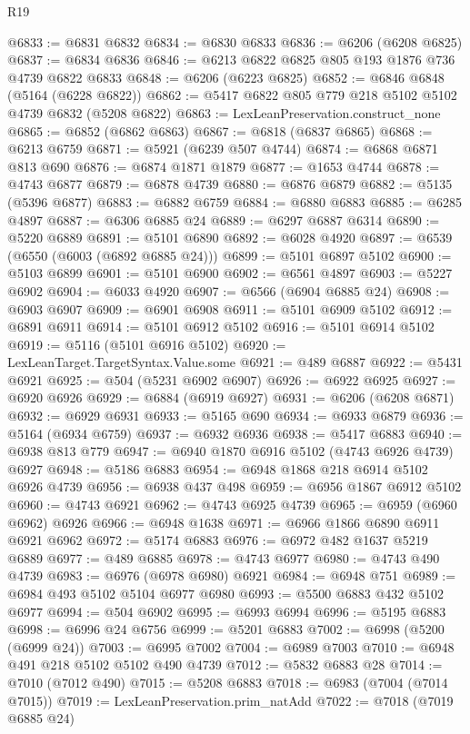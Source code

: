 \begin{lexlean}{R19}
\begin{coremodule}
{{{{{{{{{{{@6833 := @6831 @6832
@6834 := @6830 @6833
@6836 := @6206 (@6208 @6825)
@6837 := @6834 @6836
@6846 := @6213 @6822 @6825 @805 @193 @1876 @736 @4739 @6822 @6833
@6848 := @6206 (@6223 @6825)
@6852 := @6846 @6848 (@5164 (@6228 @6822))
@6862 := @5417 @6822 @805 @779 @218 @5102 @5102 @4739 @6832 (@5208 @6822)
@6863 := LexLeanPreservation.construct_none
@6865 := @6852 (@6862 @6863)
@6867 := @6818 (@6837 @6865)
@6868 := @6213 @6759
@6871 := @5921 (@6239 @507 @4744)
@6874 := @6868 @6871 @813 @690
@6876 := @6874 @1871 @1879
@6877 := @1653 @4744
@6878 := @4743 @6877
@6879 := @6878 @4739
@6880 := @6876 @6879
@6882 := @5135 (@5396 @6877)
@6883 := @6882 @6759
@6884 := @6880 @6883
@6885 := @6285 @4897
@6887 := @6306 @6885 @24
@6889 := @6297 @6887 @6314
@6890 := @5220 @6889
@6891 := @5101 @6890
@6892 := @6028 @4920
@6897 := @6539 (@6550 (@6003 (@6892 @6885 @24)))
@6899 := @5101 @6897 @5102
@6900 := @5103 @6899
@6901 := @5101 @6900
@6902 := @6561 @4897
@6903 := @5227 @6902
@6904 := @6033 @4920
@6907 := @6566 (@6904 @6885 @24)
@6908 := @6903 @6907
@6909 := @6901 @6908
@6911 := @5101 @6909 @5102
@6912 := @6891 @6911
@6914 := @5101 @6912 @5102
@6916 := @5101 @6914 @5102
@6919 := @5116 (@5101 @6916 @5102)
@6920 := LexLeanTarget.TargetSyntax.Value.some
@6921 := @489 @6887
@6922 := @5431 @6921
@6925 := @504 (@5231 @6902 @6907)
@6926 := @6922 @6925
@6927 := @6920 @6926
@6929 := @6884 (@6919 @6927)
@6931 := @6206 (@6208 @6871)
@6932 := @6929 @6931
@6933 := @5165 @690
@6934 := @6933 @6879
@6936 := @5164 (@6934 @6759)
@6937 := @6932 @6936
@6938 := @5417 @6883
@6940 := @6938 @813 @779
@6947 := @6940 @1870 @6916 @5102 (@4743 @6926 @4739) @6927
@6948 := @5186 @6883
@6954 := @6948 @1868 @218 @6914 @5102 @6926 @4739
@6956 := @6938 @437 @498
@6959 := @6956 @1867 @6912 @5102
@6960 := @4743 @6921
@6962 := @4743 @6925 @4739
@6965 := @6959 (@6960 @6962) @6926
@6966 := @6948 @1638
@6971 := @6966 @1866 @6890 @6911 @6921 @6962
@6972 := @5174 @6883
@6976 := @6972 @482 @1637 @5219 @6889
@6977 := @489 @6885
@6978 := @4743 @6977
@6980 := @4743 @490 @4739
@6983 := @6976 (@6978 @6980) @6921
@6984 := @6948 @751
@6989 := @6984 @493 @5102 @5104 @6977 @6980
@6993 := @5500 @6883 @432 @5102 @6977
@6994 := @504 @6902
@6995 := @6993 @6994
@6996 := @5195 @6883
@6998 := @6996 @24 @6756
@6999 := @5201 @6883
@7002 := @6998 (@5200 (@6999 @24))
@7003 := @6995 @7002
@7004 := @6989 @7003
@7010 := @6948 @491 @218 @5102 @5102 @490 @4739
@7012 := @5832 @6883 @28
@7014 := @7010 (@7012 @490)
@7015 := @5208 @6883
@7018 := @6983 (@7004 (@7014 @7015))
@7019 := LexLeanPreservation.prim_natAdd
@7022 := @7018 (@7019 @6885 @24)
}}}}}}}}}}}
\end{coremodule}
\end{lexlean}
